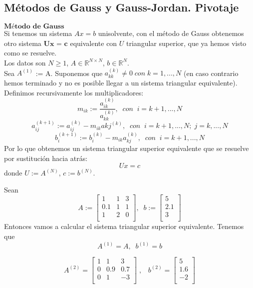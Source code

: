 \subsection{Métodos de Gauss y Gauss-Jordan. Pivotaje}
\begin{nlist}
\item $\textbf{Método de Gauss}$\\
Si tenemos un sistema $Ax = b$ unisolvente, con el método de Gauss obtenemos otro sistema $\textbf{Ux = c}$ equivalente con $U$ triangular superior, que ya hemos visto como se resuelve.\\
Los datos son $N \geq 1$, $A \in \mathbb{R}^{N \times N}$, $b \in \mathbb{R}^N$.\\
Sea $A^{(1)}$ := A. Suponemos que $a_{kk}^{(k)} \neq 0 \; con \; k = 1,...,N$ (en caso contrario hemos terminado y no es posible llegar a un sistema triangular equivalente). Definimos recursivamente los multiplicadores:
\[ m_{ik} := \frac{a_{ik}^{(k)}}{a_{kk}^{(k)}}, \; \; con \; \; i = k+1,...,N \]
\[ a_{ij}^{(k+1)} := a_{ij}^{(k)} - m_{ik}a{kj}^{(k)}, \; \; con \; \; i = k+1,...,N; \; j = k,...,N \]
\[ b_i^{(k+1)} := b_i^{(k)} - m_{ik}a_{kj}^{(k)}, \; \; con \; \; i = k+1,...,N \]
Por lo que obtenemos un sistema triangular superior equivalente que se resuelve por sustitución hacia atrás:
\[ Ux = c \]
donde $U := A^{(N)}$, $c := b^{(N)}$.
	\begin{ejemplo}
	Sean
	\[ A := 
	\begin{bmatrix}
	1 & 1 & 3 \\
	0.1 & 1 & 1 \\
	1 & 2 & 0 \\
	\end{bmatrix}, \; \;
	b :=
	\begin{bmatrix}
	5 \\
	2.1 \\
	3 \\
	\end{bmatrix} \]
	Entonces vamos a calcular el sistema triangular superior equivalente.
	Tenemos que
	\[ A^{(1)} = A, \; \; b^{(1)} = b \]
			
	\[ A^{(2)} =
	\begin{bmatrix}
	1 & 1 & 3 \\
	0 & 0.9 & 0.7 \\
	0 & 1 & -3 \\
	\end{bmatrix} \; ,
	\; \; \;
	b^{(2)} =
	\begin{bmatrix}
	5 \\
	1.6 \\
	-2 \\
	\end{bmatrix} \]
	

\end{ejemplo}
\end{nlist}
